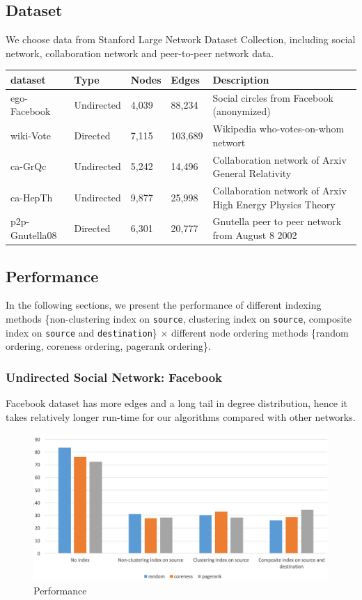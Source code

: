 \subsection{Dataset}

We choose data from Stanford Large Network Dataset Collection, including social network, collaboration network and peer-to-peer network data.

\begin{table}[H]
	\begin{tabular}{| l | l | l | l | p{7cm} |}
	  \hline			
	  dataset & Type & Nodes & Edges & Description \\ \hline
	  ego-Facebook & Undirected & 4,039 & 88,234 & Social circles from Facebook (anonymized) \\ \hline
	  wiki-Vote & Directed & 7,115 & 103,689 & Wikipedia who-votes-on-whom networt \\ \hline
	  ca-GrQc & Undirected & 5,242 & 14,496 & Collaboration network of Arxiv General Relativity \\ \hline
	  ca-HepTh & Undirected & 9,877	& 25,998 & Collaboration network of Arxiv High Energy Physics Theory \\ \hline
	  p2p-Gnutella08 & Directed & 6,301 & 20,777 & Gnutella peer to peer network from August 8 2002 \\
	  \hline  
	\end{tabular}
\end{table}


\subsection{Performance}

In the following sections, we present the performance of different indexing methods \{non-clustering index on \texttt{source}, clustering index on \texttt{source}, composite index on \texttt{source} and \texttt{destination}\} $\times$ different node ordering methods \{random ordering, coreness ordering, pagerank ordering\}.

\subsubsection{Undirected Social Network: Facebook}

Facebook dataset has more edges and a long tail in degree distribution, hence it takes relatively longer run-time for our algorithms compared with other networks.

\begin{figure}[H]
\centering
\includegraphics[width=0.8\linewidth]{fb}
\caption{Performance}
\end{figure}

